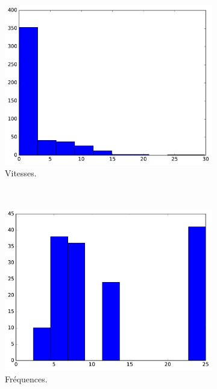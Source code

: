 	\begin{figure}[htb]
		\begin{subfigure}[t]{\subImgWclicks}
			\centering
			\includegraphics[width=\textwidth]{figures/ch3/concordeA_speed}
			\caption{Vitesses.}
			\label{fig:concordeA_speed}
		\end{subfigure}
		~
		\begin{subfigure}[t]{\subImgWclicks}
			\centering
			\includegraphics[width=\textwidth]{figures/ch3/concordeA_frequency}
			\caption{Fréquences.}
			\label{fig:concordeA_frequency}
		\end{subfigure}
		~
		\begin{subfigure}[t]{\subImgWclicks}

\end{subfigure}
\end{figure}

